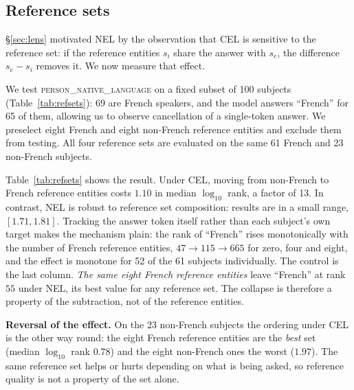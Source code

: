 
\subsection{Reference sets}
\label{sec:refsets}

\S\ref{sec:lens} motivated NEL by the observation that CEL is sensitive
to the reference set: if the reference entities $s_i$ share the answer
with $s_e$, the difference $s_e - s_i$ removes it. We now
measure that effect.

We test \textsc{person\_native\_language} on a fixed subset of 100 subjects
(Table~\ref{tab:refsets}): 69 are French speakers, and the model answers
``French'' for 65 of them, allowing us to observe cancellation of a
single-token answer. We preselect eight French and eight non-French
reference entities and exclude them from testing. All four reference sets
are evaluated on the same 61 French and 23 non-French subjects.



Table~\ref{tab:refsets} shows the result. Under CEL, moving from
non-French to French reference entities costs $1.10$ in median
$\log_{10}$ rank, a factor of 13.
In contrast, NEL is robust to reference set composition:
results are in a small range, 
$[1.71,1.81]$. Tracking the answer token
itself rather than each subject's own target makes the mechanism plain:
the rank of ``French'' rises monotonically with the number of French
reference entities, $47 \to 115 \to 665$ for zero, four and eight, and
the effect is monotone for 52 of the 61 subjects individually. The
control is the last column. \emph{The same eight French reference
entities} leave ``French'' at rank $55$ under NEL, its best value for
any reference set. The collapse is therefore a property of the subtraction,
not of the reference entities.


\textbf{Reversal of the effect.} On the 23 non-French subjects the
ordering under CEL is the other way round: the eight French reference entities are
the \emph{best} set (median $\log_{10}$ rank $0.78$) and the eight
non-French ones the worst ($1.97$). The same reference set helps or
hurts depending on what is being asked, so reference quality is not a
property of the set alone.

